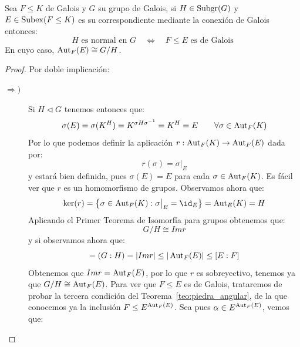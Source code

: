 \begin{teo}\label{teo:normal}
    Sea $F\leq K$ de Galois y $G$ su grupo de Galois, si $H\in \operatorname{Subgr}(G)$ y $E\in \operatorname{Subex}(F\leq K)$ es su correspondiente mediante la conexión de Galois entonces:
    \begin{equation*}
        H \text{\ es normal en\ } G \quad\Longleftrightarrow\quad F\leq E \text{\ es de Galois}
    \end{equation*}
    En cuyo caso, $\operatorname{Aut}_F(E)\cong G/H$.
    \begin{proof}
        Por doble implicación:
        \begin{description}
            \item [$\Longrightarrow )$] Si $H\lhd G$ tenemos entonces que:
                \begin{equation*}
                    \sigma(E) = \sigma(K^H) = K^{\sigma H\sigma^{-1}} = K^H = E \qquad \forall \sigma\in \operatorname{Aut}_F(K)
                \end{equation*}
                Por lo que podemos definir la aplicación $r:\operatorname{Aut}_F(K)\to \operatorname{Aut}_F(E)$ dada por:
                \begin{equation*}
                    r(\sigma) = \sigma\big|_E
                \end{equation*}
                y estará bien definida, pues $\sigma(E) = E$ para cada $\sigma\in \operatorname{Aut}_F(K)$. Es fácil ver que $r$ es un homomorfismo de grupos. Observamos ahora que:
                \begin{equation*}
                    \ker(r) = \left\{\sigma\in \Aut_F(K): \sigma\big|_E = \id_E\right\} = \Aut_E(K) = H
                \end{equation*}
                Aplicando el Primer Teorema de Isomorfía para grupos obtenemos que:
                \begin{equation*}
                    G/H\cong Im r
                \end{equation*}
                y si observamos ahora que:
                \begin{equation*}
                    [E:F] = (G:H) = |Im r| \leq |\Aut_F(E)| \leq [E:F]
                \end{equation*}
                Obtenemos que $Im r = \operatorname{Aut}_F(E)$, por lo que $r$ es sobreyectivo, tenemos ya que $G/H\cong \operatorname{Aut}_F(E)$. Para ver que $F\leq E$ es de Galois, trataremos de probar la tercera condición del Teorema~\ref{teo:piedra_angular}, de la que conocemos ya la inclusión $F\leq E^{\operatorname{Aut}_F(E)}$. Sea pues $\alpha \in E^{\operatorname{Aut}_F(E)}$, vemos que:
                \begin{equation*}

\end{equation*}
\end{description}
\end{proof}
\end{teo}
